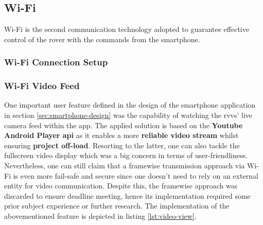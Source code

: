 \subsection{Wi-Fi}%
\label{sec:wifi-implem}
%
Wi-Fi is the second communication technology adopted to guarantee effective control of the rover with the commands from the smartphone.
%
\subsubsection{Wi-Fi Connection Setup}
\label{sec:wifi-implem-connection}
%
\subsubsection{Wi-Fi Video Feed}
\label{sec:wifi-implem-video}
%
One important user feature defined in the design of the smartphone application in section \ref{sec:smartphone-design} was the capability of watching the \gls{rvvs}' live camera feed within the app. The applied solution is based on the \textbf{Youtube Android Player \gls{api}} \cite{yt_api} as it enables a more \textbf{reliable video stream} whilst ensuring \textbf{project off-load}. Resorting to the latter, one can also tackle the fullscreen video display which was a big concern in terms of user-friendliness. Nevertheless, one can still claim that a framewise transmission approach via Wi-Fi is even more fail-safe and secure since one doesn't need to rely on an external entity for video communication.
Despite this, the framewise approach was discarded to ensure deadline meeting, hence its implementation required some prior subject experience or further research. The implementation of the abovementioned feature is depicted in listing \ref{lst:video-view}.\\
%

%
